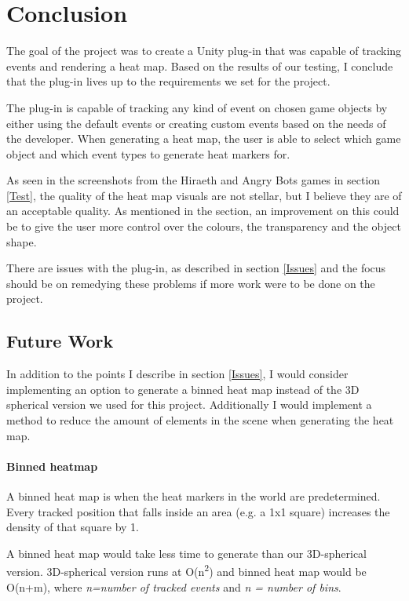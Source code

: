 \section{Conclusion}
The goal of the project was to create a Unity plug-in that was capable of tracking events and rendering a heat map. Based on the results of our testing, I conclude that the plug-in lives up to the requirements we set for the project.

The plug-in is capable of tracking any kind of event on chosen game objects by either using the default events or creating custom events based on the needs of the developer. When generating a heat map, the user is able to select which game object and which event types to generate heat markers for.

As seen in the screenshots from the Hiraeth and Angry Bots games in section \ref{Test}, the quality of the heat map visuals are not stellar, but I believe they are of an acceptable quality. As mentioned in the  section, an improvement on this could be to give the user more control over the colours, the transparency and the object shape. 

There are issues with the plug-in, as described in section \ref{Issues} and the focus should be on remedying these problems if more work were to be done on the project. 

\subsection{Future Work}
In addition to the points I describe in section \ref{Issues}, I would consider implementing an option to generate a binned heat map instead of the 3D spherical version we used for this project.  Additionally I would implement a method to reduce the amount of elements in the scene when generating the heat map.
\paragraph{Binned heatmap}
A binned heat map is when the heat markers in the world are predetermined. Every tracked position that falls inside an area (e.g. a 1x1 square) increases the density of that square by 1. 

A binned heat map would take less time to generate than our 3D-spherical version. 3D-spherical version runs at O(n\textsuperscript{2}) and binned heat map would be O(n+m), where \textit{n=number of tracked events} and \textit{n = number of bins}. 

